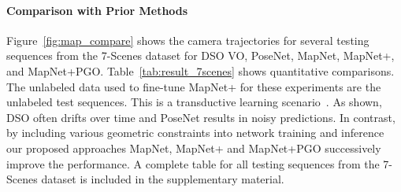 \vspace{-1em}
\paragraph{Comparison with Prior Methods}

Figure~\ref{fig:map_compare} shows the camera trajectories for several testing
sequences from the 7-Scenes dataset for DSO VO, PoseNet, MapNet, MapNet+, and MapNet+PGO.
Table~\ref{tab:result_7scenes} shows quantitative comparisons.
The unlabeled data used to fine-tune MapNet+ for these experiments are the unlabeled test sequences.
This is a transductive learning scenario~\cite{Chapelle06book, Segonne08transduction}.
As shown, DSO often drifts over time and PoseNet results in noisy predictions. In contrast, by
including various geometric constraints into network training and inference our proposed approaches
MapNet, MapNet+ and MapNet+PGO successively improve the performance.
A complete table for all testing sequences from the 7-Scenes dataset is included in the
supplementary material.  


















